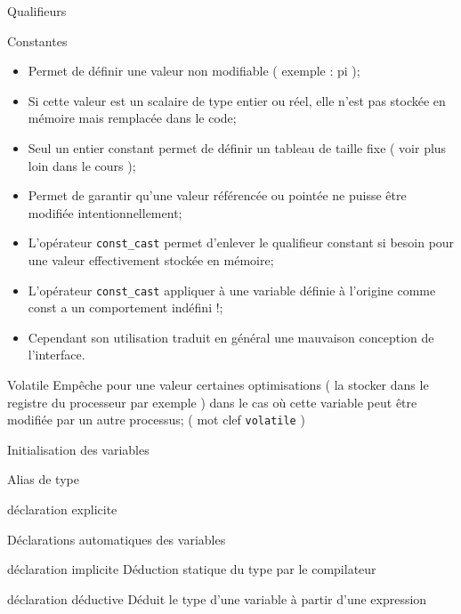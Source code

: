 \documentclass[handout,10pt]{beamer}
\newcommand{\includepartcode}[4][cpp]{

}
\begin{document}
\begin{frame}[fragile]{Qualifieurs}
\tiny
\begin{block}{Constantes}
\begin{itemize}
\item Permet de définir une valeur non modifiable ( exemple : pi );
\item Si cette valeur est un scalaire de type entier ou réel, elle n'est pas stockée en mémoire mais remplacée dans le code;
\item Seul un entier constant permet de définir un tableau de taille fixe ( voir plus loin dans le cours );
\item Permet de garantir qu'une valeur référencée ou pointée ne puisse être modifiée intentionnellement;
\item L'opérateur \lstinline$const_cast$ permet d'enlever le qualifieur constant si besoin pour une valeur effectivement stockée en mémoire;
\item L'opérateur \lstinline$const_cast$ appliquer à une variable définie à l'origine comme const a un comportement indéfini !;
\item Cependant son utilisation traduit en général une mauvaison conception de l'interface.
\end{itemize}
\end{block}
\includepartcode{constante.cpp}{5}{15}
\begin{block}{Volatile}
Empêche pour une valeur certaines optimisations ( la stocker dans le registre du processeur par exemple ) 
dans le cas où cette variable peut être modifiée par un autre processus; ( mot clef \lstinline$volatile$ )
\end{block}
\end{frame}

\begin{frame}[fragile]{Initialisation des variables}
\tiny

\begin{block}{Alias de type}
\includepartcode{declarations.cpp}{78}{78}
\end{block}

\begin{block}{déclaration explicite}
\includepartcode{declarations.cpp}{84}{104}
\end{block}

\end{frame}

\begin{frame}[fragile]{Déclarations automatiques des variables}
\tiny

\begin{block}{déclaration implicite}
Déduction statique du type par le compilateur
\includepartcode{declarations.cpp}{125}{132}
\end{block}

\begin{block}{déclaration déductive}
Déduit le type d'une variable à partir d'une expression
\includepartcode{declarations.cpp}{137}{143}
\end{block}

\end{frame}
\end{document}

